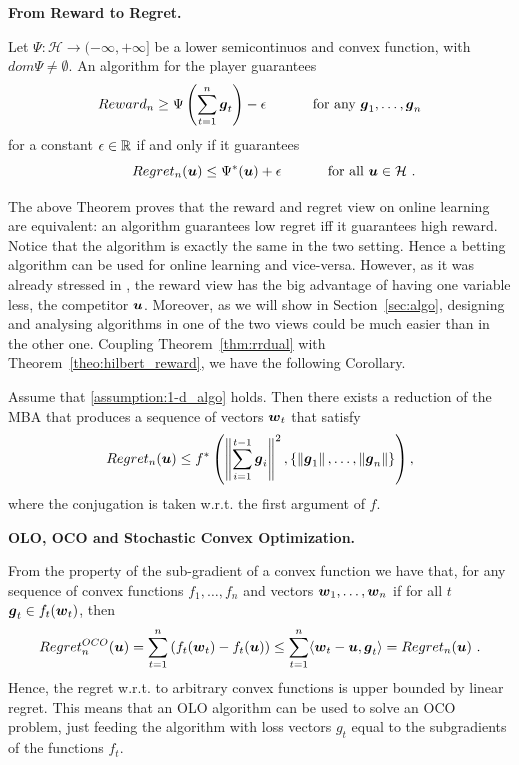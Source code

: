 \textbf{From Reward to Regret.}
\begin{theorem}
  \label{thm:rrdual}
  Let $\Psi:\mathcal{H} \rightarrow (-\infty, +\infty]$ be a lower semicontinuos and convex function, with $dom \Psi \neq \emptyset$. An
  algorithm for the player guarantees
  \[
  Reward_n \geq \Psi\left(\sum_{t=1}^n \boldsymbol{g}_t\right) - \epsilon \quad \quad \quad \textnormal{ for any } \boldsymbol{g}_1, \dots, \boldsymbol{g}_n
  \]
  for a constant $\epsilon \in \mathbb{R}$ if and only if it
  guarantees
  \begin{equation}\label{eq:regb}
  \qquad Regret_n(\boldsymbol{u}) \leq \Psi^*(\boldsymbol{u}) + \epsilon \quad \quad \quad \textnormal{ for all } \boldsymbol{u} \in \mathcal{H}~.
  \end{equation}
\end{theorem}
The above Theorem proves that the reward and regret view on online learning are equivalent: an algorithm guarantees low regret iff it guarantees high reward. Notice that the algorithm is exactly the same in the two setting.
Hence a betting algorithm can be used for online learning and vice-versa. However, as it was already stressed in \citet{McMahanO14}, the reward view has the big advantage of having one variable less, the competitor $\boldsymbol{u}$.
Moreover, as we will show in Section~\ref{sec:algo}, designing and analysing algorithms in one of the two views could be much easier than in the other one.
Coupling Theorem~\ref{thm:rrdual} with Theorem~\ref{theo:hilbert_reward}, we have the following Corollary.
\begin{cor}
\label{theo:hilbert_regret}
Assume that \ref{assumption:1-d_algo} holds. Then there exists a reduction of the \ac{MBA} that produces a sequence of vectors $\boldsymbol{w}_t$ that satisfy
\[
Regret_n(\boldsymbol{u}) \leq f^*\left( \left\|{\sum_{i=1}^{t-1} \boldsymbol{g}_i}\right\|^2, \left\{\left\|{\boldsymbol{g}_1}\right\|, \ldots, \left\|{\boldsymbol{g}_n}\right\|\right\}\right),
\]
where the conjugation is taken w.r.t. the first argument of $f$.
\end{cor}

\textbf{\ac{OLO}, \ac{OCO} and Stochastic Convex Optimization.}

From the property of the sub-gradient of a convex function we have that, for any sequence of convex functions $f_1, \ldots, f_n$ and vectors $\boldsymbol{w}_1,\ldots, \boldsymbol{w}_n$ if for all $t$ $\boldsymbol{g}_t \in f_t(\boldsymbol{w}_t)$, then
\[
Regret^{OCO}_n(\boldsymbol{u}) = \sum_{t=1}^n \left( f_t(\boldsymbol{w}_t) -f_t(\boldsymbol{u})\right) \leq \sum_{t=1}^n \langle \boldsymbol{w}_t-\boldsymbol{u}, \boldsymbol{g}_t\rangle = Regret_n(\boldsymbol{u})~.
\]
Hence, the regret w.r.t. to arbitrary convex functions is upper bounded by linear regret. This means that an \ac{OLO} algorithm can be used to solve an \ac{OCO} problem, just feeding the algorithm with loss vectors $g_t$ equal to the subgradients of the functions $f_t$.

